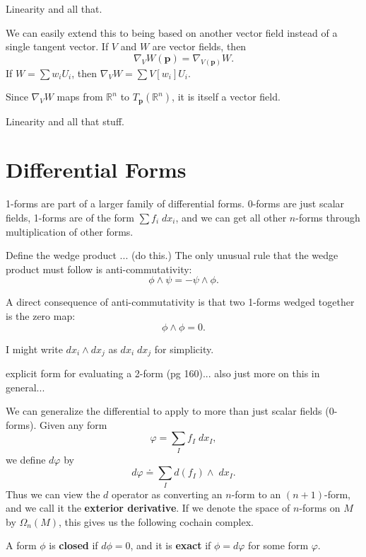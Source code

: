 \documentclass[10pt]{report}
\begin{document}
{\color{red}Linearity and all that.}

We can easily extend this to being based on another vector field instead of a single tangent vector. If $V$ and $W$ are vector fields, then
\[
	\nabla_{V}W(\mathbf{p}) = \nabla_{V(\mathbf{p})}W.
\] If $W = \sum w_i U_i$, then $\nabla_{V}W = \sum V[w_i] U_i$.

Since $\nabla_{V}W$ maps from $\mathbb{R}^n$ to $T_{\mathbf{p}}(\mathbb{R}^n)$, it is itself a vector field.

{\color{red}Linearity and all that stuff.}



\section{Differential Forms}

1-forms are part of a larger family of differential forms. 0-forms are just scalar fields, 1-forms are of the form $\sum f_i \;dx_i$, and we can get all other $n$-forms through multiplication of other forms.

Define the wedge product ... {\color{red}(do this.)} The only unusual rule that the wedge product must follow is anti-commutativity:
\[
\phi \wedge \psi = - \psi \wedge \phi.
\] 

\begin{ex}
A direct consequence of anti-commutativity is that two 1-forms wedged together is the zero map:
\[
\phi\wedge\phi = 0.
\] 
\end{ex}

\begin{note}
I might write $dx_i \wedge dx_j$ as $dx_i\;dx_j$ for simplicity.
\end{note}

{\color{red}explicit form for evaluating a 2-form (pg 160)... also just more on this in general...}

We can generalize the differential to apply to more than just scalar fields (0-forms). Given any form
\[
\varphi = \sum_{I} f_I \;dx_I,
\] we define $d\varphi$ by
\[
	d\varphi \doteq \sum_{I} d(f_I)\wedge \;dx_I.
\] 
Thus we can view the $d$ operator as converting an $n$-form to an $(n+1)$-form, and we call it the \textbf{exterior derivative}. If we denote the space of $n$-forms on $M$ by $\Omega_n(M)$, this gives us the following cochain complex.
\begin{figure}[H]
	\centering
{}
\end{figure}
A form $\phi$ is \textbf{closed} if $d\phi=0$, and it is \textbf{exact} if $\phi = d\varphi$ for some form $\varphi$.
\end{document}
